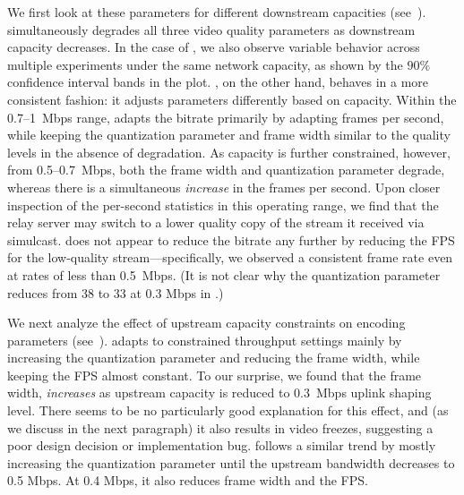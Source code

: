 We first look at these parameters for different downstream 
capacities
(see~).
\teamsbrowser simultaneously degrades all three video quality parameters as
downstream capacity decreases. In the case of \teamsbrowser, we also observe
variable behavior across multiple experiments under the same network capacity,
as shown by the $90\%$ confidence interval bands in the plot. \meet, on the
other hand, behaves in a more consistent fashion: it adjusts parameters
differently based on capacity. Within the  0.7--1~Mbps range, \meet adapts the
bitrate primarily by adapting {frames per second}, while keeping the
{quantization parameter} and {frame width} similar to the quality levels in
the absence of degradation. As capacity is further constrained, however,
from 0.5--0.7~Mbps, both the {frame width} and {quantization parameter}
degrade, whereas there is a simultaneous {\em increase} in the frames per
second. Upon closer inspection of the per-second statistics in this operating
range, we find that the relay server may switch to a lower quality copy of the
stream it received via {simulcast}. \meet does not appear to reduce the
bitrate any further by reducing the FPS for the low-quality
stream---specifically, we observed a consistent frame rate even at rates of
less than 0.5~Mbps. (It is not clear why the quantization parameter reduces
from 38 to 33 at 0.3 Mbps in \meet.)

We next analyze the effect of upstream capacity constraints on encoding
parameters
(see~).
\teams adapts to constrained throughput settings mainly by increasing the
quantization parameter and reducing the frame width, while keeping the FPS
almost constant. To our surprise, we found that the frame width, {\em
increases} as upstream capacity is reduced to 0.3~Mbps uplink shaping level.
There seems to be no particularly good explanation for this effect, and (as we
discuss in the next paragraph) it also results in video freezes, suggesting a
poor design decision or implementation bug.  \meet follows a similar trend by
mostly increasing the quantization parameter until the upstream bandwidth
decreases to 0.5 Mbps. At 0.4 Mbps, it also reduces frame width and the FPS. 

